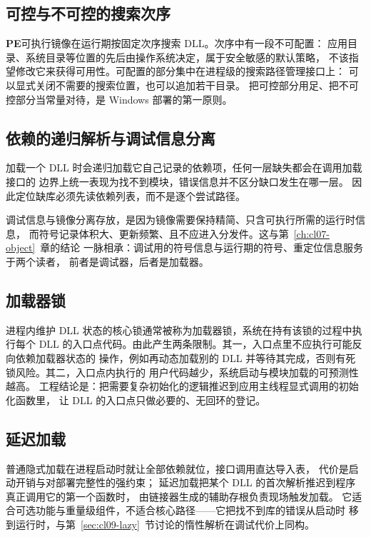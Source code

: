 \documentclass[12pt,a4paper,fontset=fandol]{ctexbook}
\newcommand{\PeFmt}{\textbf{\textsf{PE}}}
\begin{document}
\subsection{可控与不可控的搜索次序}

\PeFmt 可执行镜像在运行期按固定次序搜索 DLL。次序中有一段不可配置：
应用目录、系统目录等位置的先后由操作系统决定，属于安全敏感的默认策略，
不该指望修改它来获得可用性。可配置的部分集中在进程级的搜索路径管理接口上：
可以显式关闭不需要的搜索位置，也可以追加若干目录。
把可控部分用足、把不可控部分当常量对待，是 Windows 部署的第一原则。

\subsection{依赖的递归解析与调试信息分离}

加载一个 DLL 时会递归加载它自己记录的依赖项，任何一层缺失都会在调用加载接口的
边界上统一表现为找不到模块，错误信息并不区分缺口发生在哪一层。
因此定位缺库必须先读依赖列表，而不是逐个尝试路径。

调试信息与镜像分离存放，是因为镜像需要保持精简、只含可执行所需的运行时信息，
而符号记录体积大、更新频繁、且不应进入分发件。这与第~\ref{ch:cl07-object}~章的结论
一脉相承：调试用的符号信息与运行期的符号、重定位信息服务于两个读者，
前者是调试器，后者是加载器。

\subsection{加载器锁}

进程内维护 DLL 状态的核心锁通常被称为加载器锁，系统在持有该锁的过程中执行每个
DLL 的入口点代码。由此产生两条限制。其一，入口点里不应执行可能反向依赖加载器状态的
操作，例如再动态加载别的 DLL 并等待其完成，否则有死锁风险。其二，入口点内执行的
用户代码越少，系统启动与模块加载的可预测性越高。
工程结论是：把需要复杂初始化的逻辑推迟到应用主线程显式调用的初始化函数里，
让 DLL 的入口点只做必要的、无回环的登记。

\subsection{延迟加载}\label{sec:cl09-delayload}

\begin{compare}[title={普通隐式加载与延迟加载}]
  普通隐式加载在进程启动时就让全部依赖就位，接口调用直达导入表，
  代价是启动开销与对部署完整性的强约束；
  延迟加载把某个 DLL 的首次解析推迟到程序真正调用它的第一个函数时，
  由链接器生成的辅助存根负责现场触发加载。
  它适合可选功能与重量级组件，不适合核心路径——它把找不到库的错误从启动时
  移到运行时，与第~\ref{sec:cl09-lazy}~节讨论的惰性解析在调试代价上同构。
\end{compare}
\end{document}
